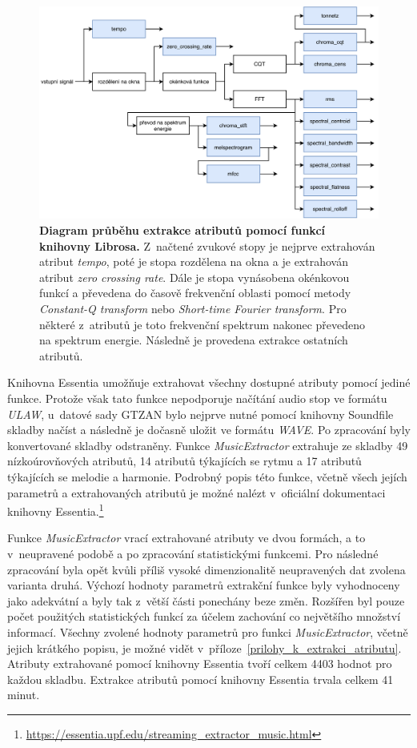 \begin{figure}[h]
    \centering
    \includegraphics[width=\textwidth]{obrazky/librosa_extrakce.pdf}
    \caption{\textbf{Diagram průběhu extrakce atributů pomocí funkcí knihovny Librosa.} Z~načtené zvukové stopy je nejprve extrahován atribut \textit{tempo}, poté je stopa rozdělena na okna a je extrahován atribut \textit{zero crossing rate}. Dále je stopa vynásobena okénkovou funkcí a převedena do časově frekvenční oblasti pomocí metody \textit{Constant-Q transform} nebo \textit{Short-time Fourier transform}.  Pro některé z~atributů je toto frekvenční spektrum nakonec převedeno na spektrum energie. Následně je provedena extrakce ostatních atributů.}
    \label{obr_librosa_extrakce}
\end{figure}


Knihovna Essentia umožňuje extrahovat všechny dostupné atributy pomocí jediné funkce. Protože však tato funkce nepodporuje načítání audio stop ve formátu \textit{ULAW}, u~datové sady GTZAN bylo nejprve nutné pomocí knihovny Soundfile skladby načíst a následně je dočasně uložit ve formátu \textit{WAVE}. Po zpracování byly konvertované skladby odstraněny. Funkce \textit{MusicExtractor} extrahuje ze skladby 49 nízkoúrovňových atributů, 14 atributů týkajících se rytmu a 17 atributů týkajících se melodie a harmonie. Podrobný popis této funkce, včetně všech jejích parametrů a extrahovaných atributů je možné nalézt v~oficiální dokumentaci knihovny Essentia.\footnote{\url{https://essentia.upf.edu/streaming\_extractor\_music.html}} 

Funkce \textit{MusicExtractor} vrací extrahované atributy ve dvou formách, a to v~neupravené podobě a po zpracování statistickými funkcemi. Pro následné zpracování byla opět kvůli příliš vysoké dimenzionalitě neupravených dat zvolena varianta druhá. Výchozí hodnoty parametrů extrakční funkce byly vyhodnoceny jako adekvátní a byly tak z~větší části ponechány beze změn. Rozšířen byl pouze počet použitých statistických funkcí za účelem zachování co největšího množství informací. Všechny zvolené hodnoty parametrů pro funkci \textit{MusicExtractor}, včetně jejich krátkého popisu, je možné vidět v~příloze~\ref{prilohy_k_extrakci_atributu}. Atributy extrahované pomocí knihovny Essentia tvoří celkem 4403 hodnot pro každou skladbu. Extrakce atributů pomocí knihovny Essentia trvala celkem 41 minut.

